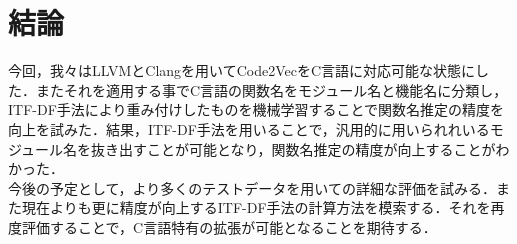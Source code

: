 \documentclass[submit,techrep,noauthor]{ipsj}
\begin{document}
\section{結論}
今回，我々はLLVMとClangを用いてCode2VecをC言語に対応可能な状態にした．またそれを適用する事でC言語の関数名をモジュール名と機能名に分類し，ITF-DF手法により重み付けしたものを機械学習することで関数名推定の精度を向上を試みた．結果，ITF-DF手法を用いることで，汎用的に用いられれいるモジュール名を抜き出すことが可能となり，関数名推定の精度が向上することがわかった．\\
今後の予定として，より多くのテストデータを用いての詳細な評価を試みる．また現在よりも更に精度が向上するITF-DF手法の計算方法を模索する．それを再度評価することで，C言語特有の拡張が可能となることを期待する．











\end{document}
